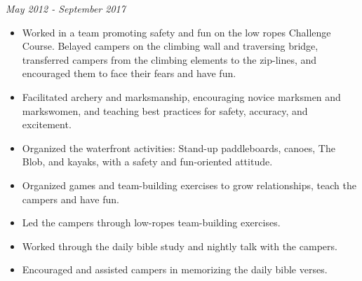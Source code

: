 \documentclass[letterpaper,10pt]{article}
\providecommand{\tightlist}
  {\setlength{\itemsep}{4pt}\setlength{\parskip}{0pt}}
\begin{document}
    \hfill \emph{May 2012 - September 2017}

    \begin{itemize}
        \tightlist{}
        \item
        Worked in a team promoting safety and fun on the low ropes Challenge Course.
        Belayed campers on the climbing wall and traversing bridge, transferred campers from the climbing elements to the zip-lines, and encouraged them to face their fears and have fun.
        \item
        Facilitated archery and marksmanship, encouraging novice marksmen and markswomen, and teaching best practices for safety, accuracy, and excitement.
        \item
        Organized the waterfront activities: Stand-up paddleboards, canoes, The Blob, and kayaks, with a safety and fun-oriented attitude.
        \item
        Organized games and team-building exercises to grow relationships, teach the campers and have fun.
        \item
        Led the campers through low-ropes team-building exercises.
        \item
        Worked through the daily bible study and nightly talk with the campers.
        \item
        Encouraged and assisted campers in memorizing the daily bible verses.
    \end{itemize}
\end{document}
